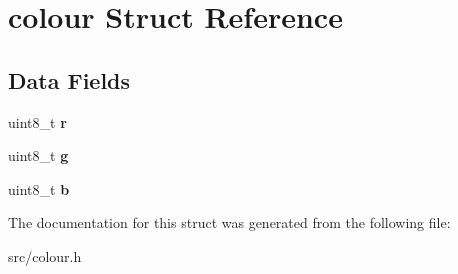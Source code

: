 \hypertarget{structcolour}{}\section{colour Struct Reference}
\label{structcolour}
\subsection*{Data Fields}
\begin{DoxyCompactItemize}
\item 
\hypertarget{structcolour_a40215fab70f7d303cb61a799e318bf73}{}uint8\+\_\+t {\bfseries r}\label{structcolour_a40215fab70f7d303cb61a799e318bf73}

\item 
\hypertarget{structcolour_a081997f66e937ead6bec62917d2c7fa0}{}uint8\+\_\+t {\bfseries g}\label{structcolour_a081997f66e937ead6bec62917d2c7fa0}

\item 
\hypertarget{structcolour_a555ec86298e623756c71b43f17881453}{}uint8\+\_\+t {\bfseries b}\label{structcolour_a555ec86298e623756c71b43f17881453}

\end{DoxyCompactItemize}


The documentation for this struct was generated from the following file\+:\begin{DoxyCompactItemize}
\item 
src/colour.\+h\end{DoxyCompactItemize}
